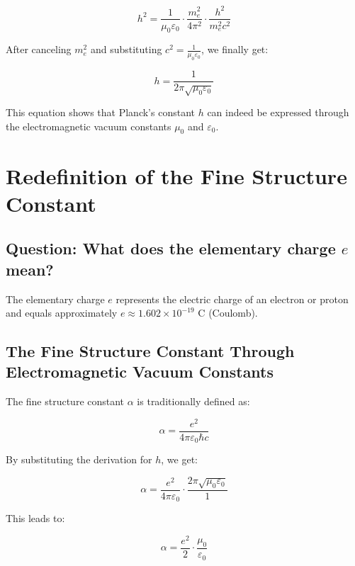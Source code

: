 \documentclass{article}
\begin{document}
	\begin{equation}
		h^2 = \frac{1}{\mu_0\varepsilon_0} \cdot \frac{m_e^2}{4\pi^2} \cdot \frac{h^2}{m_e^2c^2}
	\end{equation}
	
	After canceling $m_e^2$ and substituting $c^2 = \frac{1}{\mu_0\varepsilon_0}$, we finally get:
	
	\begin{equation}
		h = \frac{1}{2\pi\sqrt{\mu_0\varepsilon_0}}
	\end{equation}
	
	This equation shows that Planck's constant $h$ can indeed be expressed through the electromagnetic vacuum constants $\mu_0$ and $\varepsilon_0$.
	
	\section{Redefinition of the Fine Structure Constant}
	
	\subsection{Question: What does the elementary charge $e$ mean?}
	
	The elementary charge $e$ represents the electric charge of an electron or proton and equals approximately $e \approx 1.602 \times 10^{-19}$ C (Coulomb).
	
	\subsection{The Fine Structure Constant Through Electromagnetic Vacuum Constants}
	
	The fine structure constant $\alpha$ is traditionally defined as:
	
	\begin{equation}
		\alpha = \frac{e^2}{4\pi\varepsilon_0\hbar c}
	\end{equation}
	
	By substituting the derivation for $h$, we get:
	
	\begin{equation}
		\alpha = \frac{e^2}{4\pi\varepsilon_0} \cdot \frac{2\pi\sqrt{\mu_0\varepsilon_0}}{1}
	\end{equation}
	
	This leads to:
	
	\begin{equation}
		\alpha = \frac{e^2}{2} \cdot \frac{\mu_0}{\varepsilon_0}
	\end{equation}
	
\end{document}
